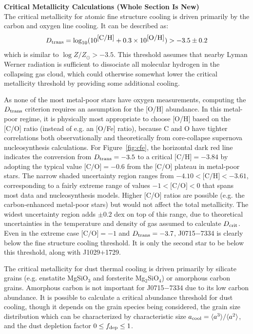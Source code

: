 \documentclass{natureprintstyle}
\newcommand{\logzzsun}{\ensuremath{\log Z/Z_\odot}\xspace}
\newcommand{\umpstar}{J0715$-$7334\xspace}
\newcommand{\caffaustar}{J1029$+$1729\xspace}
\begin{document}
\vspace{1mm}
\noindent
{\bf Critical Metallicity Calculations (Whole Section Is New)}
\\
\noindent
The critical metallicity for atomic fine structure cooling is driven primarily by the carbon and oxygen line cooling\cite{Bromm2003}. It can be described as\cite{Frebel2007}:
\begin{equation*}
    D_{\rm trans}=\log_{10}(10^{\mbox{[C/H]}} + 0.3 \times 10^{\mbox{[O/H]}}) > -3.5 \pm 0.2
\end{equation*}
which is similar to $\logzzsun > -3.5$. This threshold assumes that nearby Lyman Werner radiation is sufficient to dissociate all molecular hydrogen in the collapsing gas cloud, which could otherwise somewhat lower the critical metallicity threshold by providing some additional cooling\cite{Smith2024}.

As none of the most metal-poor stars have oxygen measurements, computing the $D_{\rm trans}$ criterion requires an assumption for the [O/H] abundance. In this metal-poor regime, it is physically most appropriate to choose [O/H] based on the [C/O] ratio (instead of e.g. an [O/Fe] ratio), because C and O have tighter correlations both observationally\cite{Suda2008,Amarsi2019} and theoretically from core-collapse supernova nucleosynthesis calculations\cite{Heger2010,Ji2024}. For Figure~\ref{fig:cfe}, the horizontal dark red line indicates the conversion from 
$D_{\rm trans}=-3.5$ to a critical $\mbox{[C/H]}=-3.84$ by adopting the typical value $\mbox{[C/O]}=-0.6$ from the [C/O] plateau in metal-poor stars\cite{Amarsi2019}. The narrow shaded uncertainty region ranges from $-4.10 < \mbox{[C/H]} < -3.61$, corresponding to a fairly extreme range of values $-1 < \mbox{[C/O]} < 0$ that spans most data and nucleosynthesis models\cite{Suda2008,Heger2010}. Higher [C/O] ratios are possible (e.g. the carbon-enhanced metal-poor stars) but would not affect the total metallicity. The widest uncertainty region adds $\pm 0.2$ dex on top of this range, due to theoretical uncertainties in the temperature and density of gas assumed to calculate $D_{\rm crit}$\cite{Bromm2003}.
Even in the extreme case $\mbox{[C/O]} = -1$ and $D_{\rm trans}=-3.7$, \umpstar is clearly below the fine structure cooling threshold. It is only the second star to be below this threshold, along with \caffaustar\cite{Caffau2024}. 

The critical metallicity for dust thermal cooling is driven primarily by silicate grains (e.g. enstatite MgSiO$_3$ and forsterite Mg$_2$SiO$_4$) or amorphous carbon grains\cite{Bianchi2007,Schneider2012,Ji2014,Chiaki2015,Chiaki2017}. Amorphous carbon is not important for \umpstar due to its low carbon abundance\cite{Chiaki2017}.
It is possible to calculate a critical abundance threshold for dust cooling, though it depends on the grain species being considered, the grain size distribution which can be characterized by characteristic size $a_{\rm cool} = \langle a^3 \rangle / \langle a^2 \rangle$, and the dust depletion factor $0 \leq f_{\rm dep} \leq 1$\cite{Schneider2012,Ji2014,Chiaki2017}.
\end{document}
